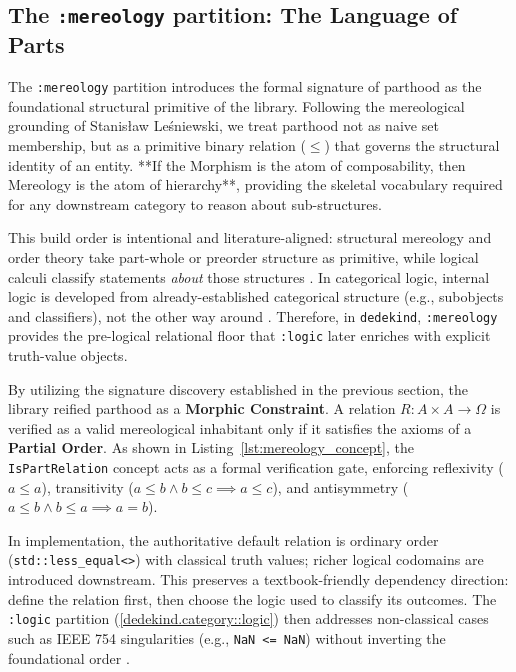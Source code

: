 \documentclass[11pt, a4paper]{report}
\begin{document}
\subsection{The \texttt{:mereology} partition: The Language of Parts}

The \texttt{:mereology} partition introduces the formal signature of parthood as the foundational structural primitive of the library. Following the mereological grounding of Stanisław Leśniewski, we treat parthood not as naive set membership, but as a primitive binary relation ($\leq$) that governs the structural identity of an entity. **If the Morphism is the atom of composability, then Mereology is the atom of hierarchy**, providing the skeletal vocabulary required for any downstream category to reason about sub-structures.

This build order is intentional and literature-aligned: structural mereology and order theory take part-whole or preorder structure as primitive, while logical calculi classify statements \emph{about} those structures \cite{mormann2013structural}. In categorical logic, internal logic is developed from already-established categorical structure (e.g., subobjects and classifiers), not the other way around \cite{lambek1988higher, mclarty1992toposes}. Therefore, in \texttt{dedekind}, \texttt{:mereology} provides the pre-logical relational floor that \texttt{:logic} later enriches with explicit truth-value objects.

By utilizing the signature discovery established in the previous section, the library reified parthood as a \textbf{Morphic Constraint}. A relation $R: A \times A \to \Omega$ is verified as a valid mereological inhabitant only if it satisfies the axioms of a \textbf{Partial Order}. As shown in Listing~\ref{lst:mereology_concept}, the \texttt{IsPartRelation} concept acts as a formal verification gate, enforcing reflexivity ($a \leq a$), transitivity ($a \leq b \land b \leq c \implies a \leq c$), and antisymmetry ($a \leq b \land b \leq a \implies a = b$). 

In implementation, the authoritative default relation is ordinary order (\texttt{std::less\_equal<>}) with classical truth values; richer logical codomains are introduced downstream. This preserves a textbook-friendly dependency direction: define the relation first, then choose the logic used to classify its outcomes. The \texttt{:logic} partition (\ref{dedekind.category::logic}) then addresses non-classical cases such as IEEE 754 singularities (e.g., \texttt{NaN <= NaN}) without inverting the foundational order \cite{rasiowa1974algebraic, ieee754_2019}.
\end{document}
